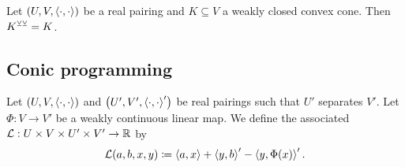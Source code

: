 \begin{corollary}
Let $\sSet{U,V,\pair{\cdot,\cdot}}$ be a real pairing and $K\subseteq V$ a weakly closed convex cone. Then $K^{\veebar\veebar} = K$.
\end{corollary}


\subsection{Conic programming}
\begin{definition}
Let $\sSet{U,V,\pair{\cdot,\cdot}}$ and $\sSet{U',V',\pair{\cdot,\cdot}'}$ be real pairings such that $U'$ separates $V'$. Let $\Phi: V\to V'$ be a weakly continuous linear map. We define the associated  $\mathcal{L}: U\times V\times U'\times V'\to \mathbb{R}$ by
\[ \mathcal{L}(a,b,x,y) \coloneqq \left\langle a,x \right\rangle + \left\langle y,b \right\rangle' - \left\langle y,\Phi(x) \right\rangle'. \]
\end{definition}

